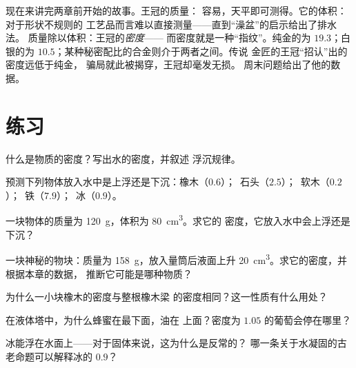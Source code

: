 \begin{example}[阿基米德破案]\label{ex:g6:density-floating:crown}
现在来讲完两章前开始的故事。王冠的质量：
容易，天平即可测得。它的体积：对于形状不规则的
工艺品而言难以直接测量——直到“澡盆”的启示给出了排水法。
质量除以体积：王冠的\emph{密度}——
而密度就是一种“指纹”。纯金的为 $19.3$；白银的为
$10.5$；某种秘密配比的合金则介于两者之间。传说
金匠的王冠“招认”出的密度远低于纯金，
骗局就此被揭穿，王冠却毫发无损。
周末问题给出了他的数据。
\end{example}

\section{练习}

\begin{exercise}[$\star$]\label{exo:g6:density-floating:1}
什么是物质的密度？写出水的密度，并叙述
浮沉规律。
\end{exercise}

\begin{exercise}[$\star$]\label{exo:g6:density-floating:2}
预测下列物体放入水中是上浮还是下沉：橡木（$0.6$）；\ 石头（$2.5$）；\
软木（$0.2$）；\ 铁（$7.9$）；\ 冰（$0.9$）。
\end{exercise}

\begin{exercise}[$\star$]\label{exo:g6:density-floating:3}
一块物体的质量为 \qty{120}{g}，体积为 \qty{80}{cm^3}。求它的
密度，它放入水中会上浮还是下沉？
\end{exercise}

\begin{exercise}[$\star$]\label{exo:g6:density-floating:4}
一块神秘的物块：质量为 \qty{158}{g}，放入量筒后液面上升
\qty{20}{cm^3}。求它的密度，并根据本章的数据，
推断它可能是哪种物质？
\end{exercise}

\begin{exercise}[$\star$]\label{exo:g6:density-floating:5}
为什么一小块橡木的密度与整根橡木梁
的密度相同？这一性质有什么用处？
\end{exercise}

\begin{exercise}[$\star$]\label{exo:g6:density-floating:6}
在液体塔中，为什么蜂蜜在最下面，油在
上面？密度为 $1.05$ 的葡萄会停在哪里？
\end{exercise}

\begin{exercise}[$\star$]\label{exo:g6:density-floating:7}
冰能浮在水面上——对于固体来说，这为什么是反常的？
哪一条关于水凝固的古老命题可以解释冰的 $0.9$？
\end{exercise}

